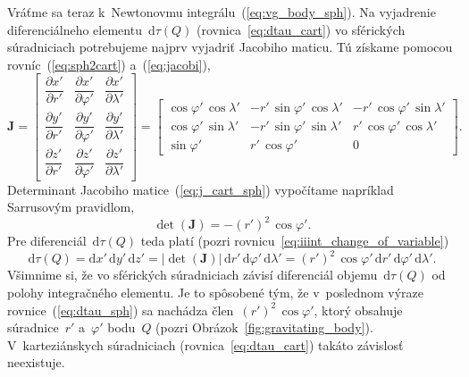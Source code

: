 \documentclass[a4paper, 12pt]{book}
\newcommand{\diff}{\mathrm d}
\begin{document}
Vráťme sa teraz k~Newtonovmu integrálu~(\ref{eq:vg_body_sph}).  Na vyjadrenie 
diferenciálneho elementu~$\diff \tau(Q)$ (rovnica~\ref{eq:dtau_cart}) vo 
sférických súradniciach potrebujeme najprv vyjadriť Jacobiho maticu.  Tú 
získame pomocou rovníc~(\ref{eq:sph2cart}) a~(\ref{eq:jacobi}),
%
\begin{equation}
\label{eq:j_cart_sph}
\mathbf{J} =
\begin{bmatrix}
\dfrac{\partial x'}{\partial{r'}} & \dfrac{\partial x'}{\partial \varphi'} 
& \dfrac{\partial x'}{\partial \lambda'}\\[2ex]
%
\dfrac{\partial y'}{\partial{r'}} & \dfrac{\partial y'}{\partial{\varphi'}} 
& \dfrac{\partial y'}{\partial \lambda'}\\[2ex]
%
\dfrac{\partial z'}{\partial{r'}} & \dfrac{\partial z'}{\partial{\varphi'}} 
& \dfrac{\partial z'}{\partial \lambda'}
\end{bmatrix}
%
=
%
\begin{bmatrix}
\cos\varphi' \, \cos\lambda' & -r' \, \sin\varphi' \, \cos\lambda' & -r' \, 
\cos\varphi' \, \sin\lambda'
\\[2ex]
\cos\varphi' \, \sin\lambda' & -r' \, \sin\varphi' \, \sin\lambda' &  r' \, 
\cos\varphi' \, \cos\lambda'
\\[2ex]
 \sin\varphi'                & r' \, \cos\varphi'                  & 0
\end{bmatrix}
%
{.}
%
\end{equation}
%
Determinant Jacobiho matice~(\ref{eq:j_cart_sph}) vypočítame napríklad 
Sarrusovým pravidlom,
%
\begin{equation}
\det (\mathbf{J}) = -(r')^2 \, \cos\varphi'{.}
\end{equation}
%
Pre diferenciál~$\diff \tau(Q)$ teda platí (pozri 
rovnicu~\ref{eq:iiint_change_of_variable})
%
\begin{equation}
\label{eq:dtau_sph}
\diff \tau(Q) = \diff x' \, \diff y' \, \diff z' = | \det (\mathbf{J}) | \, 
\diff r' \, \diff \varphi' \, \diff \lambda' = (r')^2 \, \cos\varphi' \, \diff 
r' \, \diff \varphi' \, \diff \lambda'{.}
\end{equation}
%
Všimnime si, že vo sférických súradniciach závisí diferenciál objemu~$\diff 
\tau(Q)$ od polohy integračného elementu.  Je to spôsobené tým, že v~poslednom 
výraze rovnice~(\ref{eq:dtau_sph}) sa nachádza člen~$(r')^2 \, \cos\varphi'$, 
ktorý obsahuje súradnice~$r'$ a~$\varphi'$ bodu~$Q$ (pozri 
Obrázok~\ref{fig:gravitating_body}).  V~karteziánskych súradniciach 
(rovnica~\ref{eq:dtau_cart}) takáto závislosť neexistuje.
\end{document}
